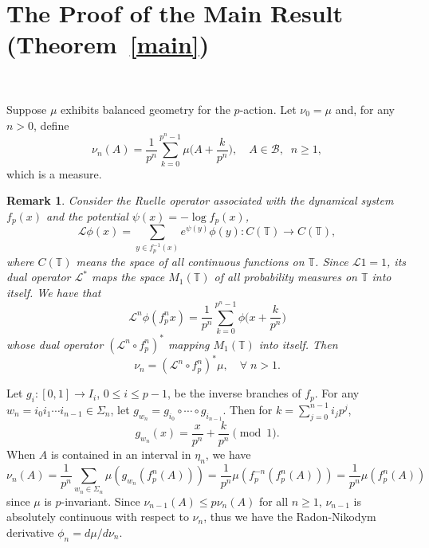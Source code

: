 \documentclass[11pt]{amsart}
\newtheorem{remark}{Remark}
\theoremstyle{definition}
\def\m{\mu}
\def\T{\mathbb{T}}
\def\B{\mathcal{B}}
\def\Si{\Sigma}
\begin{document}

\section{\bf The Proof of the Main Result (Theorem~\ref{main})}~\label{prsect}

 Suppose $\mu$ exhibits balanced geometry for the $p$-action. Let $\nu_{0}=\m$ and, for any $n>0$, define 
$$
\nu_{n} (A) = \frac{1}{p^{n}}\sum_{k=0}^{p^{n}-1} \m \Big(A+ \frac{k}{p^{n}}\Big), \quad A\in \B, \;\;n\geq 1,
$$
which is a measure. 

\medskip
\begin{remark}
Consider the Ruelle operator associated with the dynamical system $f_{p}(x)$ and the potential $\psi (x) =-\log f_{p} (x)$,
$$
{\mathcal L} \phi (x) =\sum_{y\in f_{p}^{-1}(x)} e^{\psi (y)} \phi (y): C(\T) \to C(\T),
$$
where $C(\T)$ means the space of all continuous functions on $\T$. Since ${\mathcal L}1=1$, its dual operator
${\mathcal L}^{*}$ maps the space $M_{1} (\T)$ of all probability measures on $\T$ into itself. We have that 
$$
{\mathcal L}^{n} \phi (f^{n}_{p}x)  = \frac{1}{p^{n} } \sum_{k=0}^{p^{n}-1}  \phi \Big(x+\frac{k}{p^{n}}\Big)
$$
whose dual operator $({\mathcal L}^{n}\circ f^{n}_{p})^{*}$ mapping $M_{1} (\T)$ into itself.  Then
$$
\nu_{n} =  ({\mathcal L}^{n} \circ f^{n}_{p})^{*} \mu, \quad \forall\; n>1.
$$
\end{remark}

 Let $g_{i}: [0,1]\to I_{i}$, $0\leq i\leq p-1$, be the inverse branches of $f_{p}$. For any $w_{n}=i_{0} i_{1}\cdots i_{n-1}\in\Si_{n}$, let
$
g_{w_{n}}= g_{i_{0}}\circ \cdots \circ g_{i_{n-1}}.
$
Then for $k=\sum_{j=0}^{n-1} i_{j}p^{j}$,
$$
g_{w_{n}} (x) =\frac{x}{p^{n}} +\frac{k}{p^{n}} \pmod{1}.
$$
When $A$ is contained in an interval in $\eta_{n}$, we have
$$
\nu_{n} (A) = \frac{1}{p^{n}} \sum_{w_{n}\in \Si_{n}} \m (g_{w_{n}} (f^{n}_{p} (A)))= \frac{1}{p^{n}} \m (f_{p}^{-n} (f^{n}_{p} (A)))=\frac{1}{p^{n}} \m (f^{n}_{p} (A))
$$
since $\m$ is $p$-invariant. 
Since $\nu_{n-1} (A) \leq p \nu_{n} (A)$ for all $n\geq 1$, $\nu_{n-1}$ is absolutely continuous with respect to $\nu_{n}$, thus we have the Radon-Nikodym derivative
$
\phi_{n} =d\m/d\nu_{n}.
$
\end{document}
